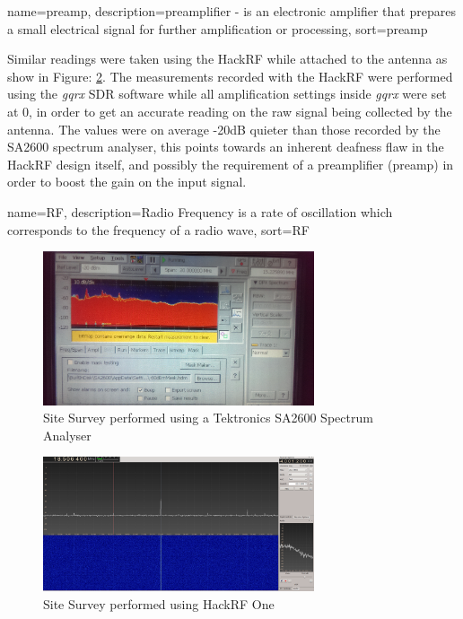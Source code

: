 \documentclass[runningheads,a4paper]{llncs}
\begin{document}
{
  name={preamp},
  description={preamplifier - is an electronic amplifier that prepares a small electrical signal for further amplification or processing},
  sort=preamp
}

Similar readings were taken using the HackRF while attached to the antenna as show in Figure: \ref{fig:site_survey_hackrf}. The measurements recorded with the HackRF were performed using the \textit{gqrx} \gls{SDR} software while all amplification settings inside \textit{gqrx} were set at 0, in order to get an accurate reading on the raw signal being collected by the antenna. The values were on average -20dB quieter than those recorded by the SA2600 spectrum analyser, this points towards an inherent deafness flaw in the HackRF design itself, and possibly the requirement of a preamplifier (\gls{preamp}) in order to boost the gain on the input signal. 

{
  name={RF},
  description={Radio Frequency is a rate of oscillation which corresponds to the frequency of a radio wave},
  sort=RF
}

%
\begin{figure}[here]
\centering
\includegraphics[width=8cm]{images/26}
\caption{Site Survey performed using a Tektronics SA2600 Spectrum Analyser}
\label{fig:site_survey_spec_analyser}
\end{figure}
%

%
\begin{figure}[here]
\centering
\includegraphics[width=8cm]{images/31}
\caption{Site Survey performed using HackRF One}
\label{fig:site_survey_hackrf}
\end{figure}
%
\end{document}
